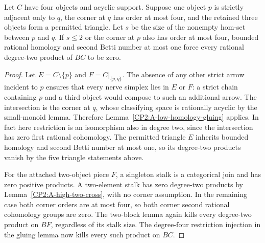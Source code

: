 \begin{theorem}
\label{CP2:A-pendant-edge-permitted-triangle}
Let $C$ have four objects and acyclic support. Suppose
one object $p$ is strictly adjacent only to $q$, the
corner at $q$ has order at most four, and the retained
three objects form a permitted triangle. Let $s$ be the
size of the nonempty hom-set between $p$ and $q$.
If $s\leq2$ or the corner at $p$ also has order at most
four, bounded rational homology and second Betti number
at most one force every rational degree-two product of
$BC$ to be zero.
\end{theorem}
\begin{proof}
Let $E=C\setminus\{p\}$ and $F=C|_{\{p,q\}}$. The absence
of any other strict arrow incident to $p$ ensures that
every nerve simplex lies in $E$ or $F$: a strict chain
containing $p$ and a third object would compose to such
an additional arrow. The intersection is the corner at
$q$, whose classifying space is rationally acyclic by
the small-monoid lemma. Therefore
Lemma~\ref{CP2:A-low-homology-gluing} applies. In fact
here restriction is an isomorphism also in degree two,
since the intersection has zero first rational cohomology.
The permitted triangle $E$ inherits bounded homology
and second Betti number at most one, so its degree-two
products vanish by the five triangle statements above.

For the attached two-object piece $F$, a singleton stalk
is a categorical join and has zero positive products.
A two-element stalk has zero degree-two products by
Lemma~\ref{CP2:A-high-two-cross}, with no corner assumption.
In the remaining case both corner orders are at most
four, so both corner second rational cohomology groups
are zero. The two-block lemma again kills every
degree-two product on $BF$, regardless of its stalk size.
The degree-four restriction injection in the gluing
lemma now kills every such product on $BC$.
\end{proof}

